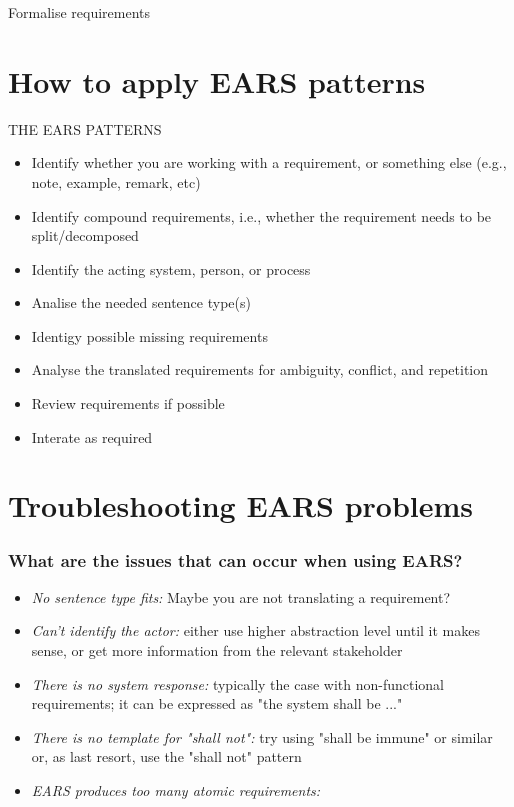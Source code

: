 \documentclass[aspectratio=169]{beamer}
\begin{document}
\begin{frame}[fragile]
\begin{frame}[fragile]
\begin{frame}[fragile]
\begin{slide}{Formalise requirements}
\end{slide}



\section*{How to apply EARS patterns}

\begin{slide}{THE EARS PATTERNS}
  \begin{itemize}
  \item Identify whether you are working with a requirement, or something else (e.g., note, example, remark, etc)
  \item Identify compound requirements, i.e., whether the requirement needs to be split/decomposed 
  \item Identify the acting system, person, or process
  \item Analise the needed sentence type(s)
  \item Identigy possible missing requirements
  \item Analyse the translated requirements for ambiguity, conflict, and repetition
  \item Review requirements if possible
  \item Interate as required
  \end{itemize}
\end{slide}

\section*{Troubleshooting EARS problems}

\begin{frame}
  \frametitle{What are the issues that can occur when using EARS?}
  \begin{itemize}
  \item {\it No sentence type fits:} Maybe you are not translating a requirement?
  \item {\it Can't identify the actor:} either use higher abstraction level until it makes sense, or get more information from the relevant stakeholder
  \item {\it There is no system response:}  typically the case with non-functional requirements; it can be expressed as "the system shall be ..."
  \item {\it There is no template for "shall not":} try using "shall be immune" or similar or, as last resort, use the "shall not" pattern
  \item {\it EARS produces too many atomic requirements:} 
  \end{itemize}
  

\end{frame}
\end{frame}
\end{frame}
\end{frame}
\end{document}
